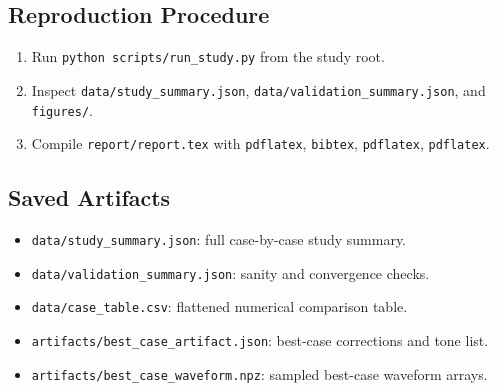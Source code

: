 \documentclass[aps,pra,twocolumn,reprint,amsmath,amssymb]{revtex4-2}
\begin{document}
\subsection{Reproduction Procedure}
\begin{enumerate}
\item Run \texttt{python scripts/run\_study.py} from the study root.
\item Inspect \texttt{data/study\_summary.json}, \texttt{data/validation\_summary.json}, and \texttt{figures/}.
\item Compile \texttt{report/report.tex} with \texttt{pdflatex}, \texttt{bibtex}, \texttt{pdflatex}, \texttt{pdflatex}.
\end{enumerate}

\subsection{Saved Artifacts}
\begin{itemize}
\item \texttt{data/study\_summary.json}: full case-by-case study summary.
\item \texttt{data/validation\_summary.json}: sanity and convergence checks.
\item \texttt{data/case\_table.csv}: flattened numerical comparison table.
\item \texttt{artifacts/best\_case\_artifact.json}: best-case corrections and tone list.
\item \texttt{artifacts/best\_case\_waveform.npz}: sampled best-case waveform arrays.
\end{itemize}
\end{document}
